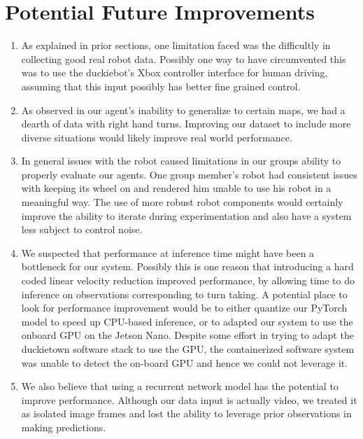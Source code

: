 \documentclass{article}
\begin{document}
\section{Potential Future Improvements}
\begin{enumerate}
    \item As explained in prior sections, one limitation faced was the difficultly in collecting good real robot data. Possibly one way to have circumvented this was to use the duckiebot's Xbox controller interface for human driving, assuming that this input possibly has better fine grained control.
    \item As observed in our agent's inability to generalize to certain maps, we had a dearth of data with right hand turns. Improving our dataset to include more diverse situations would likely improve real world performance.
    \item In general issues with the robot caused limitations in our groups ability to properly evaluate our agents. One group member's robot had consistent issues with keeping its wheel on and rendered him unable to use his robot in a meaningful way. The use of more robust robot components would certainly improve the ability to iterate during experimentation and also have a system less subject to control noise.
    \item We suspected that performance at inference time might have been a bottleneck for our system. Possibly this is one reason that introducing a hard coded linear velocity reduction improved performance, by allowing time to do inference on observations corresponding to turn taking. A potential place to look for performance improvement would be to either quantize our PyTorch model to speed up CPU-based inference, or to adapted our system to use the onboard GPU on the Jetson Nano. Despite some effort in trying to adapt the duckietown software stack to use the GPU, the containerized software system was unable to detect the on-board GPU and hence we could not leverage it.
    \item We also believe that using a recurrent network model has the potential to improve performance. Although our data input is actually video, we treated it as isolated image frames and lost the ability to leverage prior observations in making predictions.
\end{enumerate}



\end{document}
